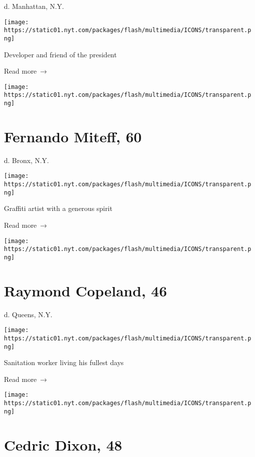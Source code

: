 d. Manhattan, N.Y.

\texttt{[image: https://static01.nyt.com/packages/flash/multimedia/ICONS/transparent.png]}

Developer and friend of the president

 Read more~→

\href{https://www.nytimes.com/2020/04/17/nyregion/fernando-miteff-dead-coronavirus.html}{}

\texttt{[image: https://static01.nyt.com/packages/flash/multimedia/ICONS/transparent.png]}

\hypertarget{fernando-miteff-60}{%
\section{Fernando Miteff, 60}\label{fernando-miteff-60}}

d. Bronx, N.Y.

\texttt{[image: https://static01.nyt.com/packages/flash/multimedia/ICONS/transparent.png]}

Graffiti artist with a generous spirit

 Read more~→

\href{https://www.nytimes.com/2020/04/17/obituaries/raymond-copeland-dead-coronavirus.html}{}

\texttt{[image: https://static01.nyt.com/packages/flash/multimedia/ICONS/transparent.png]}

\hypertarget{raymond-copeland-46}{%
\section{Raymond Copeland, 46}\label{raymond-copeland-46}}

d. Queens, N.Y.

\texttt{[image: https://static01.nyt.com/packages/flash/multimedia/ICONS/transparent.png]}

Sanitation worker living his fullest days

 Read more~→

\href{https://www.nytimes.com/2020/04/16/nyregion/cedric-dixon-dead-coronavirus.html}{}

\texttt{[image: https://static01.nyt.com/packages/flash/multimedia/ICONS/transparent.png]}

\hypertarget{cedric-dixon-48}{%
\section{Cedric Dixon, 48}\label{cedric-dixon-48}}

